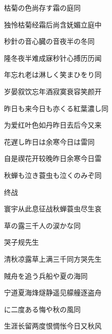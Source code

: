 \begin{haiku}
    {\FH 枯菊の色尚存す霜の庭}\hfill{\FH 同}

    {\FK 独怜枯菊经霜后尚含妩媚立庭中}
\end{haiku}

\begin{haiku}
    {\FH 秒針の音心臓の音夜半の冬}\hfill{\FH 同}

    {\FK 隆冬夜半难成寐秒针心搏历历闻}
\end{haiku}

\begin{haiku}
    {\FH 年忘れ老は淋しく笑まひをり}\hfill{\FH 同}

    {\FK 岁晏叙饮忘年酒寂寞衰容笑颜开}
\end{haiku}

\begin{haiku}
    {\FH 昨日も来今日も亦くる紅葉濃し}\hfill{\FH 同}

    {\FK 为爱红叶色如丹昨日去后今又来}
\end{haiku}

\begin{haiku}
    {\FH 花遅し昨日は余寒今日は雷}\hfill{\FH 同}

    {\FK 自是禊花开较晚昨日余寒今日雷}
\end{haiku}

\begin{haiku}
    {\FH 秋蝉も泣き蓑虫も泣くのみぞ}\hfill{\FH 同}

    {\FK 终战}

    {\FK 寰宇从此息征战秋蝉蓑虫尽生哀}
\end{haiku}

\begin{haiku}
    {\FH 草の露三千人の涙かな}\hfill{\FH 同}

    {\FK 哭子规先生}

    {\FK 清秋凉露草上满三千同方哭先生}
\end{haiku}

\begin{haiku}
    {\FH 賊舟を追う兵船や夏の海}\hfill{\FH 同}

    {\FK 宁道夏海烽燧静遥见艨艟逐盗舟}
\end{haiku}

\begin{haiku}
    {\FH {}に二度ある悔や秋の風}\hfill{\FH 同}

    {\FK 生涯长留两度恨惆怅今日又秋风}
\end{haiku}

